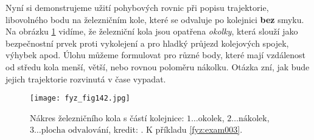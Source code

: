 Nyní si demonstrujeme užití pohybových rovnic při popisu trajektorie, libovolného bodu na 
železničním kole, které se odvaluje po kolejnici \textbf{bez} smyku. Na obrázku \ref{fyz:fig142} 
vidíme, že železniční kola jsou opatřena \emph{okolky}, která slouží jako bezpečnostní prvek proti 
vykolejení a pro hladký průjezd kolejových spojek, výhybek apod. Úlohu můžeme formulovat pro různé 
body, které mají vzdálenost od středu kola menší, větší, nebo rovnou poloměru nákolku. Otázka zní, 
jak bude jejich trajektorie rozvinutá v čase vypadat.

\begin{figure}[ht!]  %
  \centering
  \texttt{[image: fyz\_fig142.jpg]}
  \caption{Nákres železničního kola s částí kolejnice: \(1\ldots\text{okolek}\), \(2\ldots 
          \text{nákolek}\), \(3\ldots\text{plocha odvalování}\), kredit: \wikiOkolek. K příkladu 
          \ref{fyz:exam003}.}
  \label{fyz:fig142}
\end{figure}

